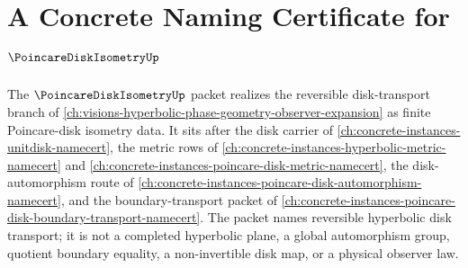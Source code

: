 \chapter{A Concrete Naming Certificate for $\PoincareDiskIsometryUp$}
\label{ch:concrete-instances-poincare-disk-isometry-namecert}

The $\PoincareDiskIsometryUp$ packet realizes the reversible disk-transport branch of \autoref{ch:visions-hyperbolic-phase-geometry-observer-expansion} as finite Poincare-disk isometry data. It sits after the disk carrier of \autoref{ch:concrete-instances-unitdisk-namecert}, the metric rows of \autoref{ch:concrete-instances-hyperbolic-metric-namecert} and \autoref{ch:concrete-instances-poincare-disk-metric-namecert}, the disk-automorphism route of \autoref{ch:concrete-instances-poincare-disk-automorphism-namecert}, and the boundary-transport packet of \autoref{ch:concrete-instances-poincare-disk-boundary-transport-namecert}. The packet names reversible hyperbolic disk transport; it is not a completed hyperbolic plane, a global automorphism group, quotient boundary equality, a non-invertible disk map, or a physical observer law.

